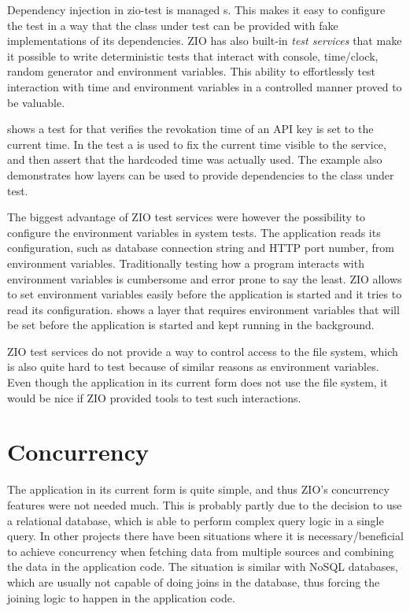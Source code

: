 Dependency injection in zio-test is managed s. This makes it easy to configure the test in a way that the class under test can be provided with fake implementations of its dependencies. ZIO has also built-in \emph{test services} that make it possible to write deterministic tests that interact with console, time/clock, random generator and environment variables. This ability to effortlessly test interaction with time and environment variables in a controlled manner proved to be valuable.

 shows a test for  that verifies the revokation time of an API key is set to the current time. In the test a  is used to fix the current time visible to the service, and then assert that the hardcoded time was actually used. The example also demonstrates how layers can be used to provide dependencies to the class under test.



The biggest advantage of ZIO test services were however the possibility to configure the environment variables in system tests. The application reads its configuration, such as database connection string and HTTP port number, from environment variables. Traditionally testing how a program interacts with environment variables is cumbersome and error prone to say the least. ZIO  allows to set environment variables easily before the application is started and it tries to read its configuration.  shows a layer that requires environment variables that will be set before the application is started and kept running in the background.



ZIO test services do not provide a way to control access to the file system, which is also quite hard to test because of similar reasons as environment variables. Even though the application in its current form does not use the file system, it would be nice if ZIO provided tools to test such interactions.


\section{Concurrency}
The application in its current form is quite simple, and thus ZIO's concurrency features were not needed much. This is probably partly due to the decision to use a relational database, which is able to perform complex query logic in a single query. In other projects there have been situations where it is necessary/beneficial to achieve concurrency when fetching data from multiple sources and combining the data in the application code. The situation is similar with NoSQL databases, which are usually not capable of doing joins in the database, thus forcing the joining logic to happen in the application code.

